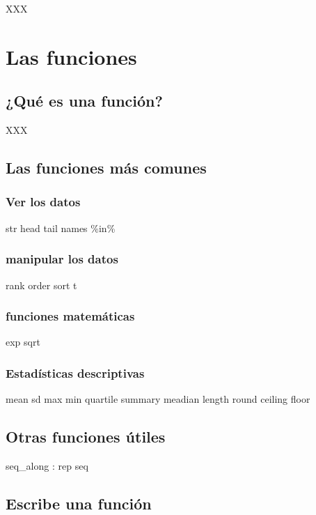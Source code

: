 \documentclass[]{book}
\begin{document}
XXX

\chapter{Las funciones}\label{fonctions}

\section{¿Qué es una función?}\label{que-es-una-funcion}

XXX

\section{Las funciones más comunes}\label{las-funciones-mas-comunes}

\subsection{Ver los datos}\label{ver-los-datos}

str head tail names \%in\%

\subsection{manipular los datos}\label{manipular-los-datos}

rank order sort t

\subsection{funciones matemáticas}\label{funciones-matematicas}

exp sqrt

\subsection{Estadísticas descriptivas}\label{estadisticas-descriptivas}

mean sd max min quartile summary meadian length round ceiling floor

\section{Otras funciones útiles}\label{otras-funciones-utiles}

seq\_along : rep seq

\section{Escribe una función}\label{escribe-una-funcion}
\end{document}
